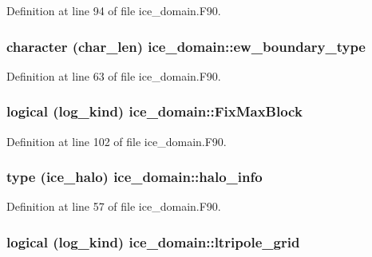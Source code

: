Definition at line 94 of file ice\_\-domain.F90.\hypertarget{namespaceice__domain_a56566cef9f35bb56cb7a97e73ce17acc}{
\subsubsection[{ew\_\-boundary\_\-type}]{\setlength{\rightskip}{0pt plus 5cm}character (char\_\-len) {\bf ice\_\-domain::ew\_\-boundary\_\-type}}}
\label{namespaceice__domain_a56566cef9f35bb56cb7a97e73ce17acc}


Definition at line 63 of file ice\_\-domain.F90.\hypertarget{namespaceice__domain_a2d52e3f832101d05076304dedcbfd465}{
\subsubsection[{FixMaxBlock}]{\setlength{\rightskip}{0pt plus 5cm}logical (log\_\-kind) {\bf ice\_\-domain::FixMaxBlock}}}
\label{namespaceice__domain_a2d52e3f832101d05076304dedcbfd465}


Definition at line 102 of file ice\_\-domain.F90.\hypertarget{namespaceice__domain_a06df1ee3a618bfdd4e7f6445a5376604}{
\subsubsection[{halo\_\-info}]{\setlength{\rightskip}{0pt plus 5cm}type ({\bf ice\_\-halo}) {\bf ice\_\-domain::halo\_\-info}}}
\label{namespaceice__domain_a06df1ee3a618bfdd4e7f6445a5376604}


Definition at line 57 of file ice\_\-domain.F90.\hypertarget{namespaceice__domain_aec6b06cf3394cb064898a46434391258}{
\subsubsection[{ltripole\_\-grid}]{\setlength{\rightskip}{0pt plus 5cm}logical (log\_\-kind) {\bf ice\_\-domain::ltripole\_\-grid}}}
\label{namespaceice__domain_aec6b06cf3394cb064898a46434391258}


